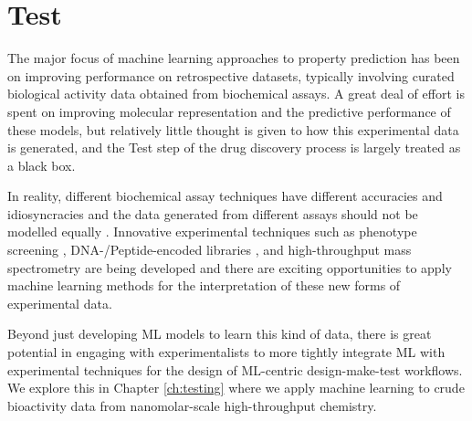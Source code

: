\section*{Test}
The major focus of machine learning approaches to property prediction has been on improving performance on retrospective datasets, typically involving curated biological activity data obtained from biochemical assays. A great deal of effort is spent on improving molecular representation and the predictive performance of these models, but relatively little thought is given to how this experimental data is generated, and the Test step of the drug discovery process is largely treated as a black box. 

In reality, different biochemical assay techniques have different accuracies and idiosyncracies and the data generated from different assays should not be modelled equally \cite{Hughes2011Principles}. Innovative experimental techniques such as phenotype screening \cite{Chandrasekaran2021Phenotype}, DNA-/Peptide-encoded libraries \cite{GirondaMartinez2021DNALibrary, Rossler2023PeptideLibrary}, and high-throughput mass spectrometry \cite{Dunas2023MassSpec} are being developed and there are exciting opportunities to apply machine learning methods for the interpretation of these new forms of experimental data.

Beyond just developing ML models to learn this kind of data, there is great potential in engaging with experimentalists to more tightly integrate ML with experimental techniques for the design of ML-centric design-make-test workflows. We explore this in Chapter \ref{ch:testing} where we apply machine learning to crude bioactivity data from nanomolar-scale high-throughput chemistry.

